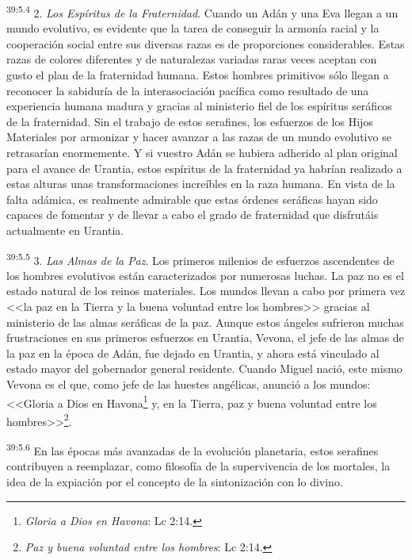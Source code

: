 \par
\textsuperscript{39:5.4} 2. \textit{Los Espíritus de la Fraternidad}. Cuando un Adán y una Eva llegan a un mundo evolutivo, es evidente que la tarea de conseguir la armonía racial y la cooperación social entre sus diversas razas es de proporciones considerables. Estas razas de colores diferentes y de naturalezas variadas raras veces aceptan con gusto el plan de la fraternidad humana. Estos hombres primitivos sólo llegan a reconocer la sabiduría de la interasociación pacífica como resultado de una experiencia humana madura y gracias al ministerio fiel de los espíritus seráficos de la fraternidad. Sin el trabajo de estos serafines, los esfuerzos de los Hijos Materiales por armonizar y hacer avanzar a las razas de un mundo evolutivo se retrasarían enormemente. Y si vuestro Adán se hubiera adherido al plan original para el avance de Urantia, estos espíritus de la fraternidad ya habrían realizado a estas alturas unas transformaciones increíbles en la raza humana. En vista de la falta adámica, es realmente admirable que estas órdenes seráficas hayan sido capaces de fomentar y de llevar a cabo el grado de fraternidad que disfrutáis actualmente en Urantia.

\par
\textsuperscript{39:5.5} 3. \textit{Las Almas de la Paz}. Los primeros milenios de esfuerzos ascendentes de los hombres evolutivos están caracterizados por numerosas luchas. La paz no es el estado natural de los reinos materiales. Los mundos llevan a cabo por primera vez <<la paz en la Tierra y la buena voluntad entre los hombres>> gracias al ministerio de las almas seráficas de la paz. Aunque estos ángeles sufrieron muchas frustraciones en sus primeros esfuerzos en Urantia, Vevona, el jefe de las almas de la paz en la época de Adán, fue dejado en Urantia, y ahora está vinculado al estado mayor del gobernador general residente. Cuando Miguel nació, este mismo Vevona es el que, como jefe de las huestes angélicas, anunció a los mundos: <<Gloria a Dios en Havona\footnote{\textit{Gloria a Dios en Havona}: Lc 2:14.} y, en la Tierra, paz y buena voluntad entre los hombres>>\footnote{\textit{Paz y buena voluntad entre los hombres}: Lc 2:14.}.

\par
\textsuperscript{39:5.6} En las épocas más avanzadas de la evolución planetaria, estos serafines contribuyen a reemplazar, como filosofía de la supervivencia de los mortales, la idea de la expiación por el concepto de la sintonización con lo divino.


